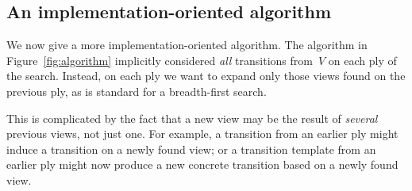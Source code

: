 
\subsection{An implementation-oriented algorithm}
\label{ssec:algorithm-2}

We now give a more implementation-oriented algorithm.  The algorithm in
Figure~\ref{fig:algorithm} implicitly considered \emph{all} transitions
from~$V$ on each ply of the search.  Instead, on each ply we want to expand
only those views found on the previous ply, as is standard for a breadth-first
search.

This is complicated by the fact that a new view may be the result of
\emph{several} previous views, not just one.  For example, a transition from
an earlier ply might induce a transition on a newly found view; or a
transition template from an earlier ply might now produce a new concrete
transition based on a newly found view.



